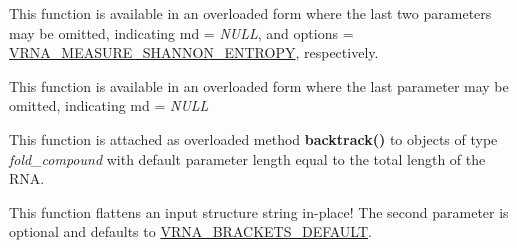 \begin{DoxyRefList}
\item[Global \mbox{\hyperlink{group__aln__utils_gaa12b481a7e7b965ef2eb1bcc4399e759}{vrna\+\_\+aln\+\_\+conservation\+\_\+col}} (const char $\ast$$\ast$alignment, const vrna\+\_\+md\+\_\+t $\ast$md\+\_\+p, unsigned int options)]\label{wrappers__wrappers000002}%
%
 This function is available in an overloaded form where the last two parameters may be omitted, indicating {\ttfamily md} = {\itshape N\+U\+LL}, and {\ttfamily options} = \mbox{\hyperlink{group__aln__utils_ga1e659227c9fc077d29989f576f129000}{V\+R\+N\+A\+\_\+\+M\+E\+A\+S\+U\+R\+E\+\_\+\+S\+H\+A\+N\+N\+O\+N\+\_\+\+E\+N\+T\+R\+O\+PY}}, respectively.  
\item[Global \mbox{\hyperlink{group__aln__utils_gab6f16a2ea93f3bfd4d089cc8d448bb16}{vrna\+\_\+aln\+\_\+conservation\+\_\+struct}} (const char $\ast$$\ast$alignment, const char $\ast$structure, const vrna\+\_\+md\+\_\+t $\ast$md)]\label{wrappers__wrappers000001}%
%
 This function is available in an overloaded form where the last parameter may be omitted, indicating {\ttfamily md} = {\itshape N\+U\+LL}  
\item[Global \mbox{\hyperlink{group__mfe__backtracking_gaaee7355f060fe9eed8e687522567715e}{vrna\+\_\+backtrack5}} (vrna\+\_\+fold\+\_\+compound\+\_\+t $\ast$fc, unsigned int length, char $\ast$structure)]\label{wrappers__wrappers000091}%
%
 This function is attached as overloaded method {\bfseries{backtrack()}} to objects of type {\itshape fold\+\_\+compound} with default parameter {\ttfamily length} equal to the total length of the R\+NA.  
\item[Global \mbox{\hyperlink{group__struct__utils__dot__bracket_gafd1304f5a86e2e3f1425e725cde44fa2}{vrna\+\_\+db\+\_\+flatten}} (char $\ast$structure, unsigned int options)]\label{wrappers__wrappers000127}%
%
 This function flattens an input structure string in-\/place! The second parameter is optional and defaults to \mbox{\hyperlink{group__struct__utils__dot__bracket_ga559ebf76b1b289f85309f4206e99aa1a}{V\+R\+N\+A\+\_\+\+B\+R\+A\+C\+K\+E\+T\+S\+\_\+\+D\+E\+F\+A\+U\+LT}}.


\end{DoxyRefList}
